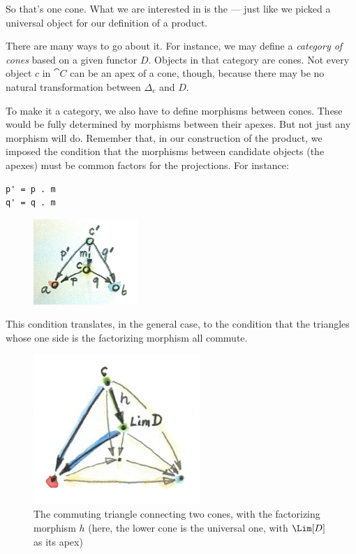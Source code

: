 \noindent
So that's one cone. What we are interested in is the  --- just like we picked a universal object for our definition of a
product.

There are many ways to go about it. For instance, we may define a
\emph{category of cones} based on a given functor $D$. Objects in that
category are cones. Not every object $c$ in $\cat{C}$ can be an
apex of a cone, though, because there may be no natural transformation
between $\Delta_c$ and $D$.

To make it a category, we also have to define morphisms between cones.
These would be fully determined by morphisms between their apexes. But
not just any morphism will do. Remember that, in our construction of the
product, we imposed the condition that the morphisms between candidate
objects (the apexes) must be common factors for the projections. For
instance:

\begin{Verbatim}
p' = p . m
q' = q . m
\end{Verbatim}

\begin{figure}[H]
\centering
\includegraphics[width=1.56250in]{images/productranking.jpg}
\end{figure}

This condition translates, in the general case, to the condition that
the triangles whose one side is the factorizing morphism all commute.

\begin{figure}[H]
\centering
\includegraphics[width=2.48958in]{images/conecommutativity.jpg}
\caption{The commuting triangle connecting two cones, with the factorizing
morphism $h$ (here, the lower cone is the universal one, with
$\Lim[D]$ as its apex)}
\end{figure}

